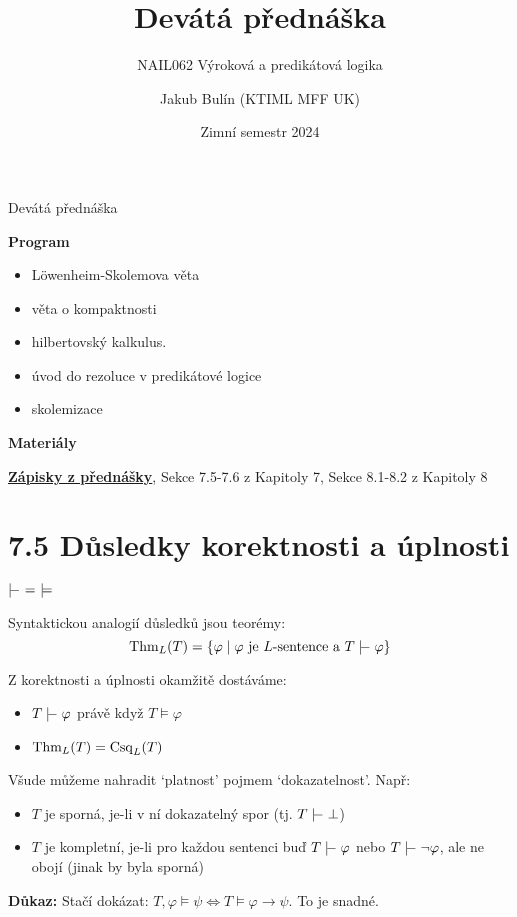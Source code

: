 \documentclass{beamer}
\title{Devátá přednáška}
\subtitle{NAIL062 Výroková a predikátová logika}
\author{Jakub Bulín (KTIML MFF UK)}
\date{Zimní semestr 2024}
\begin{document}
\maketitle


\begin{frame}{Devátá přednáška}

    \textbf{Program}
        \begin{itemize}
            \item Löwenheim-Skolemova věta
            \item věta o kompaktnosti
            \item hilbertovský kalkulus.
            \item úvod do rezoluce v predikátové logice
            \item skolemizace
        \end{itemize}

    \textbf{Materiály}

        \href{https://github.com/jbulin-mff-uk/nail062/raw/main/lecture/lecture-notes/lecture-notes.pdf}{\alert{\textbf{Zápisky z přednášky}}}, Sekce 7.5-7.6 z Kapitoly 7, Sekce 8.1-8.2 z Kapitoly 8

\end{frame}


\section{7.5 Důsledky korektnosti a úplnosti}


\begin{frame}{$\proves\ =\ \models$}

    Syntaktickou analogií \alert{důsledků} jsou \alert{teorémy}:
    $$
    \Thm_L(T)=\{\varphi\mid \varphi\text{ je $L$-sentence a } T\proves\varphi\}
    $$
    
    Z korektnosti a úplnosti okamžitě dostáváme:
        \begin{itemize}
            \item $T\proves\varphi$ právě když $T\models\varphi$
            \item $\operatorname{Thm}_L(T)=\operatorname{Csq}_L(T)$
        \end{itemize}
    
    Všude můžeme nahradit `\alert{platnost}' pojmem `\alert{dokazatelnost}'.  Např:
    \begin{itemize}
        \item $T$ je \alert{sporná}, je-li v ní dokazatelný spor (tj. \alert{$T\proves\bot$})
        \item $T$ je \alert{kompletní}, je-li pro každou sentenci buď $T\proves\varphi$ nebo $T\proves\neg\varphi$, ale ne obojí (jinak by byla sporná)
    \end{itemize}


    \textbf{Důkaz:} Stačí dokázat: $T,\varphi\models\psi\Leftrightarrow T\models\varphi\to\psi$. To je snadné.\hfill\qedsymbol

\end{frame}
\end{document}
